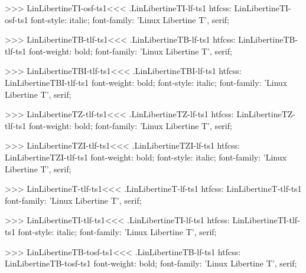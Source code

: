 {{{{{{{>>>
\<LinLibertineTI-osf-ts1\><<<
.LinLibertineTI-lf-ts1
htfcss:  LinLibertineTI-osf-ts1  font-style: italic; font-family: 'Linux Libertine T', serif;

>>>
\<LinLibertineTB-tlf-ts1\><<<
.LinLibertineTB-lf-ts1
htfcss:  LinLibertineTB-tlf-ts1  font-weight: bold; font-family: 'Linux Libertine T', serif;

>>>
\<LinLibertineTBI-tlf-ts1\><<<
.LinLibertineTBI-lf-ts1
htfcss:  LinLibertineTBI-tlf-ts1  font-weight: bold; font-style: italic; font-family: 'Linux Libertine T', serif;

>>>
\<LinLibertineTZ-tlf-ts1\><<<
.LinLibertineTZ-lf-ts1
htfcss:  LinLibertineTZ-tlf-ts1  font-weight: bold; font-family: 'Linux Libertine T', serif;

>>>
\<LinLibertineTZI-tlf-ts1\><<<
.LinLibertineTZI-lf-ts1
htfcss:  LinLibertineTZI-tlf-ts1  font-weight: bold; font-style: italic; font-family: 'Linux Libertine T', serif;

>>>
\<LinLibertineT-tlf-ts1\><<<
.LinLibertineT-lf-ts1
htfcss:  LinLibertineT-tlf-ts1  font-family: 'Linux Libertine T', serif;

>>>
\<LinLibertineTI-tlf-ts1\><<<
.LinLibertineTI-lf-ts1
htfcss:  LinLibertineTI-tlf-ts1  font-style: italic; font-family: 'Linux Libertine T', serif;

>>>
\<LinLibertineTB-tosf-ts1\><<<
.LinLibertineTB-lf-ts1
htfcss:  LinLibertineTB-tosf-ts1  font-weight: bold; font-family: 'Linux Libertine T', serif;

}}}}}}}
